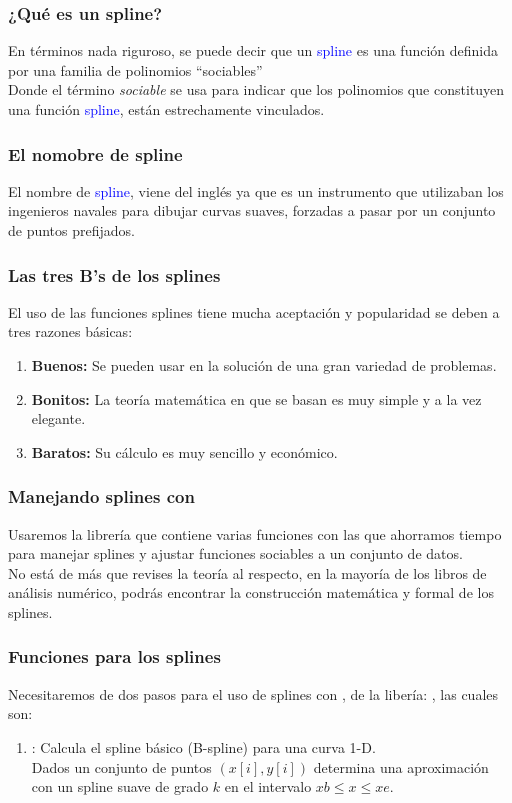 \documentclass[12pt]{beamer}
\begin{document}
\begin{frame}
\frametitle{¿Qué es un spline?}
En términos nada riguroso, se puede decir que un \textcolor{blue}{spline} es una función definida por una familia de polinomios \enquote{sociables}
\\
\bigskip
\pause
Donde el término \textit{sociable} se usa para indicar que los polinomios que constituyen una función \textcolor{blue}{spline}, están estrechamente vinculados.
\end{frame}
\begin{frame}
\frametitle{El nomobre de spline}    
El nombre de \textcolor{blue}{spline}, viene del inglés ya que es un instrumento que utilizaban los ingenieros navales para dibujar curvas suaves, forzadas a pasar por un conjunto de puntos prefijados.
\end{frame}
\begin{frame}
\frametitle{Las tres B's de los splines}
El uso de las funciones splines tiene mucha aceptación y popularidad se deben a tres razones básicas:
\pause
{}
\begin{enumerate}[<+->]
\item \textbf{Buenos:} Se  pueden usar en la solución de una gran variedad de problemas.
\item \textbf{Bonitos:} La teoría matemática en que se basan es muy simple y a la vez elegante.
\item \textbf{Baratos:} Su cálculo es muy sencillo y económico.
\end{enumerate}
\end{frame}
\begin{frame}
\frametitle{Manejando splines con \python}
Usaremos la librería  que contiene varias funciones con las que ahorramos tiempo para manejar splines y ajustar funciones sociables a un conjunto de datos.
\\
\medskip
\pause
No está de más que revises la teoría al respecto, en la mayoría de los libros de análisis numérico, podrás encontrar la construcción matemática y formal de los splines.
\end{frame}
\begin{frame}
\frametitle{Funciones para los splines}
Necesitaremos de dos pasos para el uso de splines con \python, de la libería: , las cuales son:
\pause
{}
\begin{enumerate}[<+->]
\item {}: Calcula el spline básico (B-spline) para una curva 1-D.
\\
\medskip
Dados un conjunto de puntos $(x[i],y[i])$ determina una aproximación con un spline suave de grado $k$ en el intervalo $xb \leq x \leq xe$.
\seti
\end{enumerate}
\end{frame}
\end{document}
